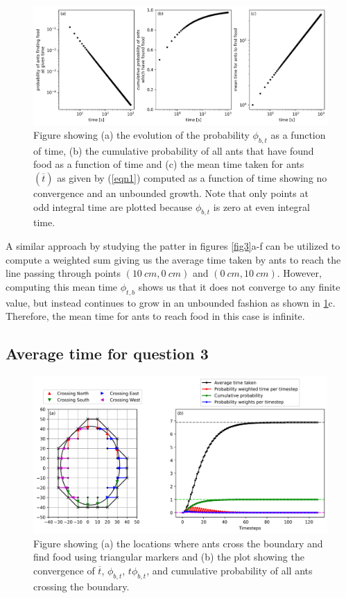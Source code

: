 \documentclass[11pt, a4paper]{article}
\begin{document}
\begin{figure}
    \includegraphics[width=\textwidth]{../Code/question2.png}
    \caption{Figure showing (a) the evolution of the probability $\phi_{b,t}$ as a function of time, (b) the cumulative probability of all ants that have found food as a function of time and (c) the mean time taken for ants $(\overline{t})$ as given by (\ref{eqn1}) computed as a function of time showing no convergence and an unbounded growth. Note that only points at odd integral time are plotted because $\phi_{b,t}$ is zero at even integral time.}
    \label{que2}
\end{figure}

A similar approach by studying the patter in figures \ref{fig3}a-f can be utilized to compute a weighted sum giving us the average time taken by ants to reach the line passing through points $(\SI{10}{cm}, \SI{0}{cm})$ and $(\SI{0}{cm}, \SI{10}{cm})$. However, computing this mean time $\phi_{t,b}$ shows us that it does not converge to any finite value, but instead continues to grow in an unbounded fashion as shown in \ref{que2}c. Therefore, the mean time for ants to reach food in this case is infinite. 

\subsection{Average time for question 3}

\begin{figure}
    \includegraphics[width=\textwidth]{../Code/question3.png}
    \caption{Figure showing (a) the locations where ants cross the boundary and find food using triangular markers and (b) the plot showing the convergence of $\overline{t}$, $\phi_{b,t}$, $t\phi_{b,t}$, and cumulative probability of all ants crossing the boundary.}
    \label{que3}
\end{figure}
\end{document}
